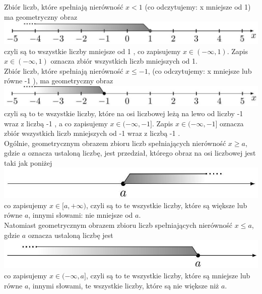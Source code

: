\documentclass[10pt]{article}
\begin{document}
Zbiór liczb, które spełniają nierówność \(x<1\) (co odczytujemy: x mniejsze od 1) ma geometryczny obraz\\
\includegraphics[max width=\textwidth, center]{2024_11_21_8f01584889ff06348ae7g-163}\\
czyli są to wszystkie liczby mniejsze od 1 , co zapisujemy \(x \in(-\infty, 1)\). Zapis \(x \in(-\infty, 1)\) oznacza zbiór wszystkich liczb mniejszych od 1.\\
Zbiór liczb, które spełniają nierówność \(x \leqslant-1\), (co odczytujemy: x mniejsze lub równe -1 ), ma geometryczny obraz\\
\includegraphics[max width=\textwidth, center]{2024_11_21_8f01584889ff06348ae7g-163(1)}\\
czyli są to te wszystkie liczby, które na osi liczbowej leżą na lewo od liczby -1 wraz z liczbą -1 , a co zapisujemy \(x \in(-\infty,-1]\). Zapis \(x \in(-\infty,-1]\) oznacza zbiór wszystkich liczb mniejszych od -1 wraz z liczbą -1 .\\
Ogólnie, geometrycznym obrazem zbioru liczb spełniających nierówność \(x \geqslant a\), gdzie \(a\) oznacza ustaloną liczbę, jest przedział, którego obraz na osi liczbowej jest taki jak poniżej\\
\includegraphics[max width=\textwidth, center]{2024_11_21_8f01584889ff06348ae7g-163(3)}\\
co zapisujemy \(x \in[a,+\infty)\), czyli są to te wszystkie liczby, które są większe lub równe \(a\), innymi słowami: nie mniejsze od \(a\).\\
Natomiast geometrycznym obrazem zbioru liczb spełniających nierówność \(x \leqslant a\), gdzie \(a\) oznacza ustaloną liczbę jest\\
\includegraphics[max width=\textwidth, center]{2024_11_21_8f01584889ff06348ae7g-163(2)}\\
co zapisujemy \(x \in(-\infty, a]\), czyli są to te wszystkie liczby, które są mniejsze lub równe \(a\), innymi słowami, te wszystkie liczby, które są nie większe niż \(a\).
\end{document}
